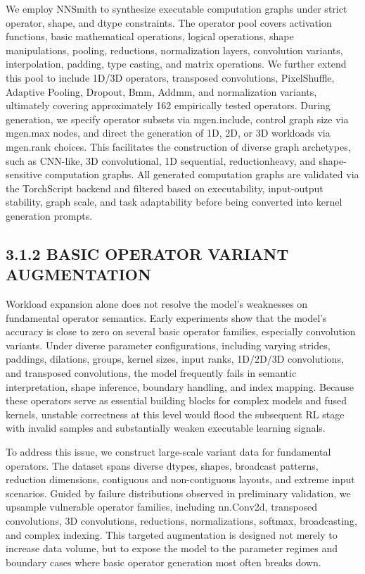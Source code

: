 \documentclass[
  10
]{article}
\begin{document}
We employ NNSmith to synthesize executable computation graphs under
strict operator, shape, and dtype constraints. The operator pool covers
activation functions, basic mathematical operations, logical operations,
shape manipulations, pooling, reductions, normalization layers,
convolution variants, interpolation, padding, type casting, and matrix
operations. We further extend this pool to include 1D/3D operators,
transposed convolutions, PixelShuffle, Adaptive Pooling, Dropout, Bmm,
Addmm, and normalization variants, ultimately covering approximately 162
empirically tested operators. During generation, we specify operator
subsets via mgen.include, control graph size via mgen.max nodes, and
direct the generation of 1D, 2D, or 3D workloads via mgen.rank choices.
This facilitates the construction of diverse graph archetypes, such as
CNN-like, 3D convolutional, 1D sequential, reductionheavy, and
shape-sensitive computation graphs. All generated computation graphs are
validated via the TorchScript backend and filtered based on
executability, input-output stability, graph scale, and task
adaptability before being converted into kernel generation prompts.

\subsection{3.1.2 BASIC OPERATOR VARIANT
AUGMENTATION}\label{basic-operator-variant-augmentation}

Workload expansion alone does not resolve the model's weaknesses on
fundamental operator semantics. Early experiments show that the model's
accuracy is close to zero on several basic operator families, especially
convolution variants. Under diverse parameter configurations, including
varying strides, paddings, dilations, groups, kernel sizes, input ranks,
1D/2D/3D convolutions, and transposed convolutions, the model frequently
fails in semantic interpretation, shape inference, boundary handling,
and index mapping. Because these operators serve as essential building
blocks for complex models and fused kernels, unstable correctness at
this level would flood the subsequent RL stage with invalid samples and
substantially weaken executable learning signals.

To address this issue, we construct large-scale variant data for
fundamental operators. The dataset spans diverse dtypes, shapes,
broadcast patterns, reduction dimensions, contiguous and non-contiguous
layouts, and extreme input scenarios. Guided by failure distributions
observed in preliminary validation, we upsample vulnerable operator
families, including nn.Conv2d, transposed convolutions, 3D convolutions,
reductions, normalizations, softmax, broadcasting, and complex indexing.
This targeted augmentation is designed not merely to increase data
volume, but to expose the model to the parameter regimes and boundary
cases where basic operator generation most often breaks down.
\end{document}
